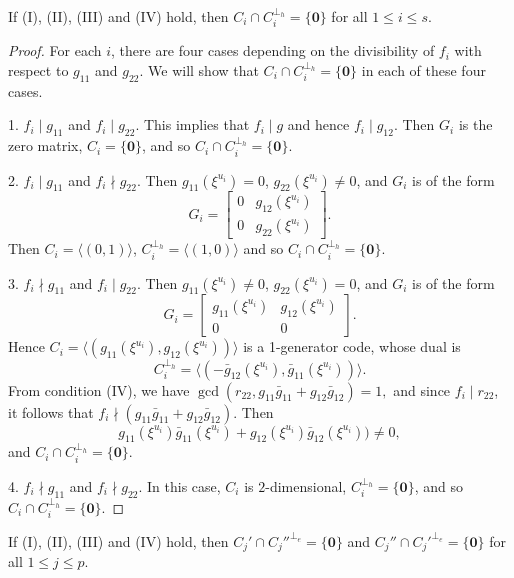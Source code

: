 \documentclass[a4paper,12pt]{article}
\begin{document}
\begin{lemma} \label{s1}  If (I), (II), (III) and (IV) hold, then $C_i \cap C_i^{\perp_h} = \{\mathbf{0}\}$ for all $1 \le i \le s$. 
\end{lemma}
\begin{proof} For each $i$, there are four cases depending on the divisibility of $f_i$ with respect to $g_{11}$ and $g_{22}$. We will show that $C_i \cap C_i^{\perp_h} = \{\mathbf{0}\}$ in each of these four cases. 
	
1. $f_i \mid g_{11}$ and $f_i \mid g_{22}$. This implies that $f_i \mid g$ and hence $f_i \mid g_{12}$. Then $G_i$ is the zero matrix, $C_i= \{\mathbf{0}\}$, and so $C_i \cap C_i^{\perp_h} = \{\mathbf{0}\}$. 
	
2. $f_i \mid g_{11}$ and $f_i \nmid g_{22}$. Then $g_{11}(\xi^{u_i})=0$, $g_{22}(\xi^{u_i})\ne0$,  and $G_i$ is of the form
\[
G_i= \begin{bmatrix}
	0 & g_{12}(\xi^{u_i}) \\
	0 & g_{22}(\xi^{u_i}) 
\end{bmatrix}.
\] 
Then $C_i=\langle (0,1) \rangle$, $C_i^{\perp_h}=\langle (1,0) \rangle$ and so $C_i \cap C_i^{\perp_h} = \{\mathbf{0}\}$. 


3. $f_i \nmid g_{11}$ and $f_i \mid g_{22}$.  Then $g_{11}(\xi^{u_i})\ne 0$, $g_{22}(\xi^{u_i})= 0$, and $G_i$ is of the form
\[
G_i=  \begin{bmatrix}
g_{11}(\xi^{u_i}) & g_{12}(\xi^{u_i}) \\
0 & 0
\end{bmatrix} .
\] 
Hence   $C_i =\langle (g_{11}(\xi^{u_i}), g_{12}(\xi^{u_i}))\rangle$ is a 1-generator code, whose dual is 
\[
C_i^{\perp_h} =\langle (-\bar{g}_{12}(\xi^{u_i}),\bar{g}_{11}(\xi^{u_i}))\rangle.
\]
From condition (IV), we have 
$
\gcd(r_{22}, g_{11}\bar{g}_{11}+g_{12}\bar{g}_{12})=1,
$
and since $f_i \mid r_{22}$, it follows that $f_i \nmid (g_{11}\bar{g}_{11}+g_{12}\bar{g}_{12})$. Then
$$
g_{11}(\xi^{u_i})\bar{g}_{11}(\xi^{u_i})+g_{12}(\xi^{u_i}) \bar{g}_{12}(\xi^{u_i})) \ne 0,
$$
 and $C_i \cap C_i^{\perp_h} = \{\mathbf{0}\}$.

4. $f_i \nmid g_{11}$ and $f_i \nmid g_{22}$. In this case, $C_i$ is $2$-dimensional, $C_i^{\perp_h} = \{\mathbf{0}\}$, and so $C_i \cap C_i^{\perp_h} = \{\mathbf{0}\}$.  \end{proof}


\begin{lemma} \label{s2}  If (I), (II), (III) and (IV) hold, then $C_j' \cap C_j''^{\perp_e} = \{\mathbf{0}\}$ and $C_j'' \cap C_j'^{\perp_e} = \{\mathbf{0}\}$  for all $1\le j \le p$.  
\end{lemma}
\end{document}
